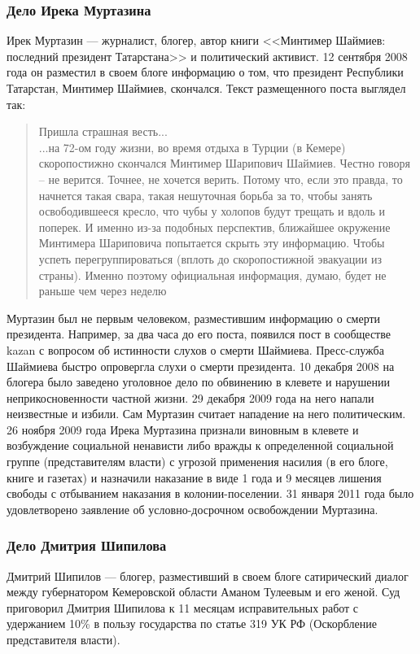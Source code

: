 \subsubsection{Дело Ирека Муртазина}
Ирек Муртазин --- журналист, блогер, автор книги <<Минтимер Шаймиев: последний президент Татарстана>> и политический активист. 12 сентября 2008 года он разместил в своем блоге информацию о том, что президент Республики Татарстан, Минтимер Шаймиев, скончался. Текст размещенного поста выглядел так\cite{murtazin_post}:
\begin{quote}
Пришла страшная весть...\\
...на 72-ом году жизни, во время отдыха в Турции (в  Кемере) скоропостижно скончался Минтимер Шарипович Шаймиев.
Честно говоря – не верится. Точнее, не хочется верить. Потому что, если это правда, то начнется такая свара, такая нешуточная борьба за то, чтобы занять освободившееся кресло, что чубы у холопов будут трещать и вдоль и поперек. И именно из-за подобных перспектив, ближайшее окружение Минтимера Шариповича попытается скрыть эту информацию. Чтобы успеть перегруппироваться (вплоть до скоропостижной эвакуации из страны). Именно поэтому официальная информация, думаю, будет не раньше чем через неделю
\end{quote}
Муртазин был не первым человеком, разместившим информацию о смерти президента. Например, за два часа до его поста, появился пост в сообществе kazan с вопросом об истинности слухов о смерти Шаймиева\cite{murtazin_later}. Пресс-служба Шаймиева быстро опровергла слухи о смерти президента\cite{murtazin_alive}. 10 декабря 2008 на блогера было заведено уголовное дело по обвинению в клевете и нарушении неприкосновенности частной жизни\cite{murtazin_delo}. 29 декабря 2009 года на него напали неизвестные и избили\cite{murtazin_beat}. Сам Муртазин считает нападение на него политическим\cite{murtazin_political}. 26 ноября 2009 года Ирека Муртазина признали виновным в клевете и возбуждение социальной ненависти либо вражды к определенной социальной группе (представителям власти\cite{murtazin_group}) с угрозой применения насилия (в его блоге, книге и газетах) и назначили наказание в виде 1 года и 9 месяцев лишения свободы с отбыванием наказания в колонии-поселении\cite{murtazin_court}. 31 января 2011 года было удовлетворено заявление об условно-досрочном освобождении Муртазина\cite{murtazin_free}.
\subsubsection{Дело Дмитрия Шипилова}
Дмитрий Шипилов --- блогер, разместивший в своем блоге сатирический диалог между губернатором Кемеровской области Аманом Тулеевым и его женой\cite{shipilov_post}. Суд приговорил Дмитрия Шипилова к 11 месяцам исправительных работ с удержанием 10\% в пользу государства по статье 319 УК РФ (Оскорбление представителя власти)\cite{shipilov_court}.
